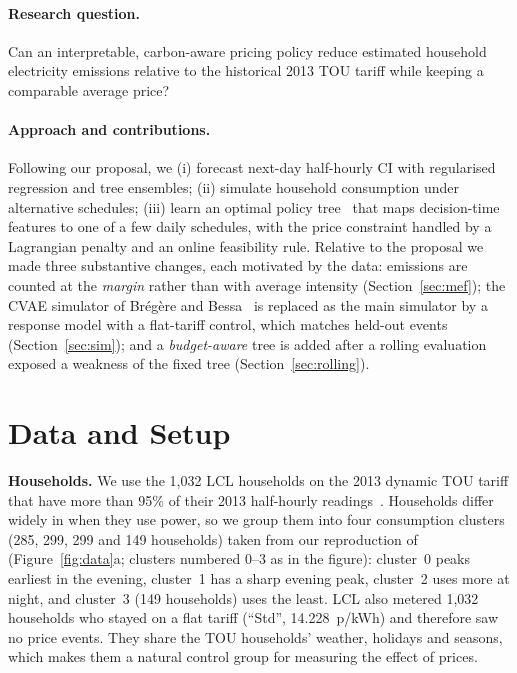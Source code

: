 \documentclass[11pt]{article}
\begin{document}
\paragraph{Research question.} Can an interpretable, carbon-aware pricing policy reduce estimated household
electricity emissions relative to the historical 2013 TOU tariff while keeping a comparable average price?

\paragraph{Approach and contributions.} Following our proposal, we (i) forecast next-day half-hourly CI with
regularised regression and tree ensembles; (ii) simulate household consumption under alternative schedules;
(iii) learn an optimal policy tree~\cite{amram2022,bertsimas2019} that maps decision-time features to one of a few
daily schedules, with the price constraint handled by a Lagrangian penalty and an online feasibility rule. Relative to
the proposal we made three substantive changes, each motivated by the data: emissions are counted at the
\emph{margin} rather than with average intensity (Section~\ref{sec:mef}); the CVAE simulator of Br\'eg\`ere and
Bessa~\cite{bregere2020} is replaced as the main simulator by a response model with a flat-tariff control, which
matches held-out events (Section~\ref{sec:sim}); and a \emph{budget-aware} tree is added after a rolling evaluation
exposed a weakness of the fixed tree (Section~\ref{sec:rolling}).

\section{Data and Setup}

\textbf{Households.} We use the 1,032 LCL households on the 2013 dynamic TOU tariff that have more than 95\% of their
2013 half-hourly readings~\cite{lcl}. Households differ widely in when they use power, so we group them into four
consumption clusters (285, 299, 299 and 149 households) taken from our reproduction of~\cite{bregere2020}
(Figure~\ref{fig:data}a; clusters numbered 0--3 as in the figure): cluster~0 peaks earliest in the evening,
cluster~1 has a sharp evening peak, cluster~2 uses more at night, and cluster~3 (149 households) uses the least.
LCL also metered 1,032 households who stayed on a flat tariff (``Std'', 14.228~p/kWh) and therefore saw no price events.
They share the TOU households' weather, holidays and seasons, which makes them a natural control group for measuring
the effect of prices.
\end{document}
